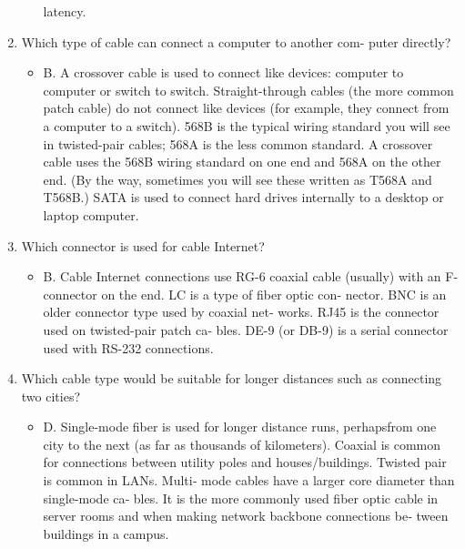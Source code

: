 \documentclass{article}
\begin{document}
\begin{enumerate}
\begin{itemize}
latency.
    \end{itemize}
    \item Which type of cable can connect a computer to another com‐
puter directly?
    \begin{itemize}
        \item B. A crossover cable is used to connect like devices: computer
to computer or switch to switch. Straight-through cables (the
more common patch cable) do not connect like devices (for
example, they connect from a computer to a switch). 568B is
the typical wiring standard you will see in twisted-pair cables;
568A is the less common standard. A crossover cable uses the
568B wiring standard on one end and 568A on the other end.
(By the way, sometimes you will see these written as T568A
and T568B.) SATA is used to connect hard drives internally to
a desktop or laptop computer.
    \end{itemize}
    \item Which connector is used for cable Internet?
    \begin{itemize}
        \item B. Cable Internet connections use RG-6 coaxial cable (usually)
with an F-connector on the end. LC is a type of fiber optic con‐
nector. BNC is an older connector type used by coaxial net‐
works. RJ45 is the connector used on twisted-pair patch ca‐
bles. DE-9 (or DB-9) is a serial connector used with RS-232
connections.
    \end{itemize}
    \item Which cable type would be suitable for longer distances such
as connecting two cities?
    \begin{itemize}
        \item D. Single-mode fiber is used for longer distance runs, perhapsfrom one city to the next (as far as thousands of kilometers).
Coaxial is common for connections between utility poles and
houses/buildings. Twisted pair is common in LANs. Multi‐
mode cables have a larger core diameter than single-mode ca‐
bles. It is the more commonly used fiber optic cable in server
rooms and when making network backbone connections be‐
tween buildings in a campus.
    \end{itemize}

\end{enumerate}
\end{document}
